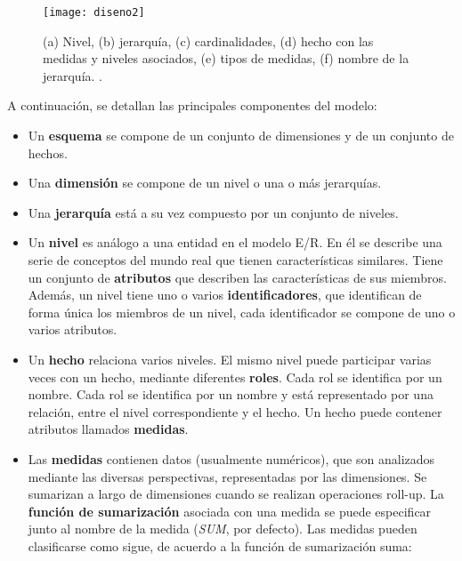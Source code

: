 \documentclass[a4paper,11pt]{article}
\begin{document}
      \begin{figure}[h]
        \begin{center}
          \texttt{[image: diseno2]}
          \caption{(a) Nivel, (b) jerarquía, (c) cardinalidades, (d) hecho con las medidas y niveles asociados, (e) tipos de medidas, (f) nombre de la jerarquía.
          \cite[p.~91]{VaismanZimanyi14}.}
          \label{disenoNotaciones}
        \end{center}
      \end{figure}
      
      A continuación, se detallan las principales componentes del modelo:
      
      \begin{itemize}
        \item Un \textbf{esquema} se compone de un conjunto de dimensiones y de un conjunto de hechos.
        \item Una \textbf{dimensión} se compone de un nivel o una o más jerarquías.
        \item Una \textbf{jerarquía} está a su vez compuesto por un conjunto de niveles. 
        \item Un \textbf{nivel} es análogo a una entidad en el modelo E/R. En él se describe una serie de conceptos del mundo real que tienen
        características similares. Tiene un conjunto de \textbf{atributos} que describen las características de sus miembros. Además, un nivel tiene uno o
        varios \textbf{identificadores}, que identifican de forma única los miembros de un nivel, cada identificador se compone de uno o varios atributos.
        \item Un \textbf{hecho} relaciona varios niveles. El mismo nivel puede participar varias veces con un hecho, mediante diferentes \textbf{roles}.
        Cada rol se identifica por un nombre. Cada rol se identifica por un nombre y está representado por una relación, entre el nivel correspondiente y el hecho.
        Un hecho puede contener atributos llamados \textbf{medidas}.
        \item Las \textbf{medidas} contienen datos (usualmente numéricos), que son analizados mediante las diversas perspectivas, representadas por las dimensiones.
        Se sumarizan a largo de dimensiones cuando se realizan operaciones roll-up. La \textbf{función de sumarización} asociada
        con una medida se puede especificar junto al nombre de la medida (\textit{SUM}, por defecto). Las medidas pueden clasificarse como sigue,
        de acuerdo a la función de sumarización suma:

\end{itemize}
\end{document}
